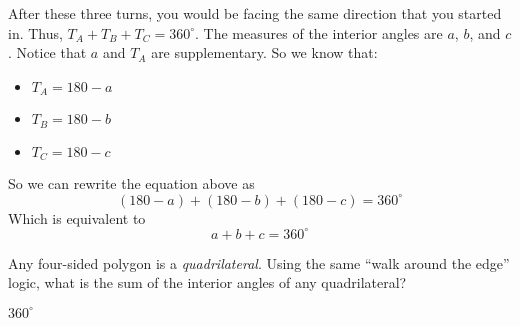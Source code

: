 After these three turns, you would be facing the same direction that
you started in. Thus, $T_A + T_B + T_C = 360^\circ$. The
measures of the interior angles are $a$, $b$, and $c$. Notice that $a$ and
$T_A$ are supplementary. So we know that:
\begin{itemize}
\item $T_A = 180 - a$
\item $T_B = 180 - b$
\item $T_C = 180 - c$
\end{itemize}
So we can rewrite the equation above as
\begin{equation*}
  (180 - a) + (180 - b) + (180 - c) = 360^\circ
\end{equation*}
Which is equivalent to
\begin{equation*}
  a + b + c = 360^\circ
\end{equation*}

\begin{Exercise}[title={Interior Angles of a Quadrilateral}, label=interior_of_quad]
  Any four-sided polygon is a \emph{quadrilateral}. Using the same
  ``walk around the edge'' logic, what is the sum of the interior
  angles of any quadrilateral?
\end{Exercise}
\begin{Answer}[ref=interior_of_quad]
$360^\circ$
\end{Answer}

